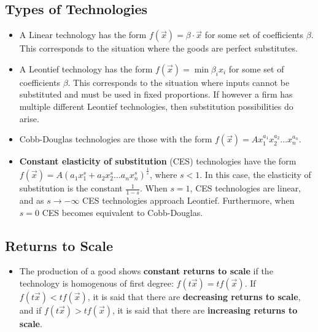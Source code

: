 \documentclass[a4paper]{article}
\begin{document}
\subsection{Types of Technologies}
\begin{itemize}
    \item A Linear technology has the form $f(\vec{x}) = \beta \cdot \vec{x}$ for some set of coefficients $\beta$. This corresponds to the situation where the goods are perfect substitutes.
    \item A Leontief technology has the form $f(\vec{x}) = \min{\beta_i x_i}$ for some set of coefficients $\beta$. This corresponds to the situation where inputs cannot be substituted and must be used in fixed proportions. If however a firm has multiple different Leontief technologies, then substitution possibilities do arise.
    \item Cobb-Douglas technologies are those with the form $f(\vec{x}) = Ax_1^{a_1}x_2^{a_2}\hdots x_n^{a_n}$.
    \item \textbf{Constant elasticity of substitution} (CES) technologies have the form $f(\vec{x}) = A(a_1x_1^{s}+ a_2x_2^{s}\hdots a_n x_n^{s})^\frac{1}{s}$, where $s < 1$. In this case, the elasticity of substitution is the constant $\frac{1}{1-s}$. When $s = 1$, CES technologies are linear, and as $s \to -\infty$ CES technologies approach Leontief. Furthermore, when $s = 0$ CES becomes equivalent to Cobb-Douglas.
\end{itemize}

\subsection{Returns to Scale}
\begin{itemize}
    \item The production of a good shows \textbf{constant returns to scale} if the technology is homogenous of first degree: $f(t\vec{x}) = tf(\vec{x})$. If $f(t\vec{x}) < tf(\vec{x})$, it is said that there are \textbf{decreasing returns to scale}, and if $f(t\vec{x}) > tf(\vec{x})$, it is said that there are \textbf{increasing returns to scale}.
\end{itemize}
\end{document}
